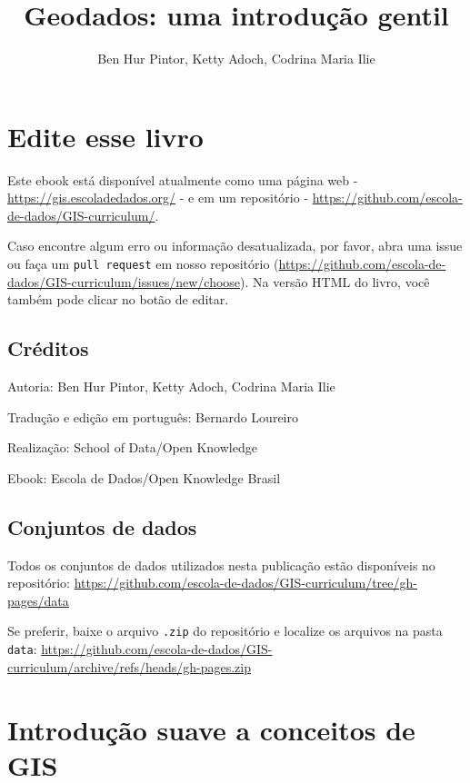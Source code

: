 \documentclass[
]{krantz}
\title{Geodados: uma introdução gentil}
\author{Ben Hur Pintor, Ketty Adoch, Codrina Maria Ilie}
\date{}
\begin{document}
\maketitle

{
\hypersetup{linkcolor=}
\setcounter{tocdepth}{1}
\tableofcontents
}
\hypertarget{edite-esse-livro}{%
\chapter{Edite esse livro}\label{edite-esse-livro}}

Este ebook está disponível atualmente como uma página web - \url{https://gis.escoladedados.org/} - e em um repositório - \url{https://github.com/escola-de-dados/GIS-curriculum/}.

Caso encontre algum erro ou informação desatualizada, por favor, abra uma issue ou faça um \texttt{pull\ request} em nosso repositório (\url{https://github.com/escola-de-dados/GIS-curriculum/issues/new/choose}). Na versão HTML do livro, você também pode clicar no botão de editar.

\hypertarget{cruxe9ditos}{%
\section{Créditos}\label{cruxe9ditos}}

Autoria: Ben Hur Pintor, Ketty Adoch, Codrina Maria Ilie

Tradução e edição em português: Bernardo Loureiro

Realização: School of Data/Open Knowledge

Ebook: Escola de Dados/Open Knowledge Brasil

\hypertarget{conjuntos-de-dados}{%
\section{Conjuntos de dados}\label{conjuntos-de-dados}}

Todos os conjuntos de dados utilizados nesta publicação estão disponíveis no repositório: \url{https://github.com/escola-de-dados/GIS-curriculum/tree/gh-pages/data}

Se preferir, baixe o arquivo \texttt{.zip} do repositório e localize os arquivos na pasta \texttt{data}: \url{https://github.com/escola-de-dados/GIS-curriculum/archive/refs/heads/gh-pages.zip}

\hypertarget{introduuxe7uxe3o-suave-a-conceitos-de-gis}{%
\chapter{Introdução suave a conceitos de GIS}\label{introduuxe7uxe3o-suave-a-conceitos-de-gis}}
\end{document}
